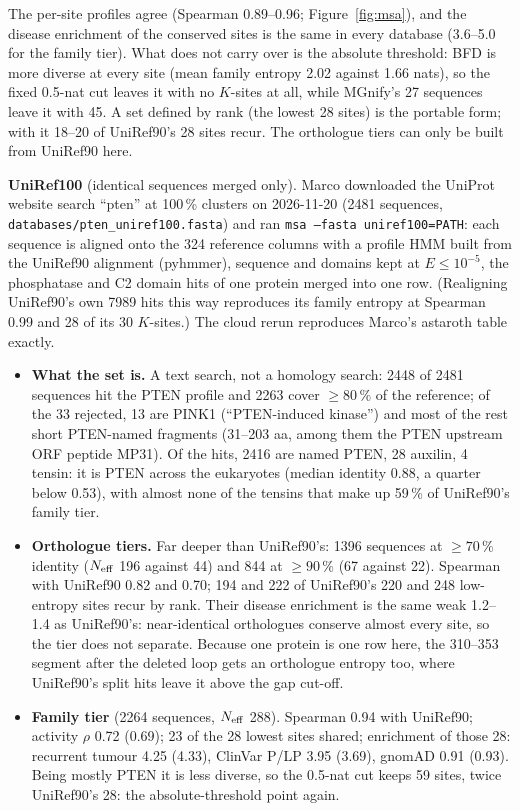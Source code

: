 \documentclass[11pt,a4paper]{article}
\newcommand{\file}[1]{\texttt{#1}}
\begin{document}
The per-site profiles agree (Spearman 0.89--0.96; Figure~\ref{fig:msa}), and
the disease enrichment of the conserved sites is the same in every database
(3.6--5.0 for the family tier). What does not carry over is the absolute
threshold: BFD is more diverse at every site (mean family entropy 2.02
against 1.66 nats), so the fixed 0.5-nat cut leaves it with no $K$-sites at
all, while MGnify's 27 sequences leave it with 45. A set defined by rank (the
lowest 28 sites) is the portable form; with it 18--20 of UniRef90's 28 sites
recur. The orthologue tiers can only be built from UniRef90 here.

\textbf{UniRef100} (identical sequences merged only). Marco downloaded the
UniProt website search ``pten'' at 100\,\% clusters on 2026-11-20 (2481
sequences, \file{databases/pten\_uniref100.fasta}) and ran \texttt{msa --fasta
uniref100=PATH}: each sequence is aligned onto the 324 reference columns with
a profile HMM built from the UniRef90 alignment (pyhmmer), sequence and
domains kept at $E\le10^{-5}$, the phosphatase and C2 domain hits of one
protein merged into one row. (Realigning UniRef90's own 7989 hits this way
reproduces its family entropy at Spearman 0.99 and 28 of its 30 $K$-sites.)
The cloud rerun reproduces Marco's astaroth table exactly.

\begin{itemize}
\item \textbf{What the set is.} A text search, not a homology search: 2448
  of 2481 sequences hit the PTEN profile and 2263 cover $\ge80\,\%$ of the
  reference; of the 33 rejected, 13 are PINK1 (``PTEN-induced kinase'') and
  most of the rest short PTEN-named fragments (31--203 aa, among them the
  PTEN upstream ORF peptide MP31). Of the hits, 2416 are named PTEN, 28 auxilin, 4 tensin: it is
  PTEN across the eukaryotes (median identity 0.88, a quarter below 0.53),
  with almost none of the tensins that make up 59\,\% of UniRef90's family
  tier.
\item \textbf{Orthologue tiers.} Far deeper than UniRef90's: 1396 sequences
  at $\ge70\,\%$ identity ($N_{\rm eff}$ 196 against 44) and 844 at
  $\ge90\,\%$ (67 against 22). Spearman with UniRef90 0.82 and 0.70; 194 and
  222 of UniRef90's 220 and 248 low-entropy sites recur by rank. Their
  disease enrichment is the same weak 1.2--1.4 as UniRef90's: near-identical
  orthologues conserve almost every site, so the tier does not separate.
  Because one protein is one row here, the 310--353 segment after the
  deleted loop gets an orthologue entropy too, where UniRef90's split hits
  leave it above the gap cut-off.
\item \textbf{Family tier} (2264 sequences, $N_{\rm eff}$ 288). Spearman 0.94
  with UniRef90; activity $\rho$ 0.72 (0.69); 23 of the 28 lowest sites shared;
  enrichment of those 28: recurrent tumour 4.25 (4.33), ClinVar P/LP 3.95
  (3.69), gnomAD 0.91 (0.93). Being mostly PTEN it is less diverse, so the
  0.5-nat cut keeps 59 sites, twice UniRef90's 28: the absolute-threshold
  point again.
\end{itemize}
\end{document}
